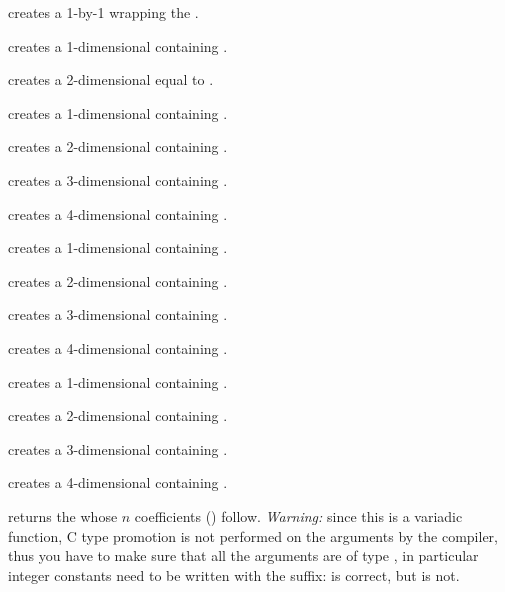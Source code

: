  creates a 1-by-1  wrapping the 
.

 creates a 1-dimensional  containing
.

 creates a 2-dimensional  equal
to \kbd{[x,y]}.

 creates a 1-dimensional 
containing .

 creates a 2-dimensional 
containing .

 creates a 3-dimensional 
containing .

 creates a 4-dimensional
 containing .

 creates a 1-dimensional 
containing .

 creates a 2-dimensional 
containing .

 creates a 3-dimensional 
containing .

 creates a 4-dimensional
 containing .

 creates a 1-dimensional 
containing .

 creates a 2-dimensional 
containing \kbd{[x, y]}.

 creates a 3-dimensional
 containing \kbd{[x, y, z]}.

 creates a 4-dimensional
 containing \kbd{[x, y, z, t]}.

 returns the  whose $n$
coefficients () follow.
\emph{Warning:} since this is a variadic function, C type promotion is not
performed on the arguments by the compiler, thus you have to make sure that all
the arguments are of type , in particular integer constants need to
be written with the  suffix:  is correct,
but  is not.

